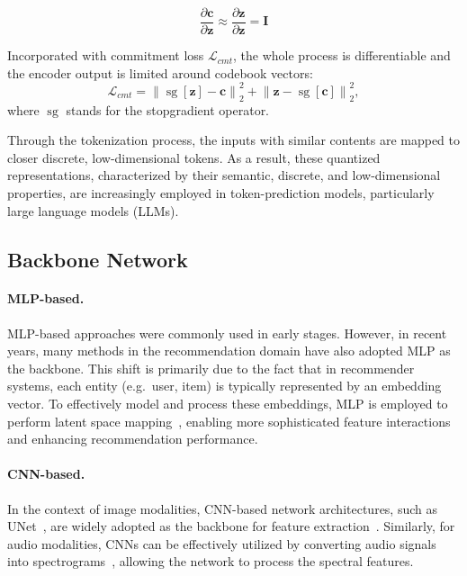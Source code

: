 \begin{equation}
\frac{\partial \boldsymbol{c}}{\partial \boldsymbol{z}} \approx \frac{\partial \boldsymbol{z}}{\partial \boldsymbol{z}}=\mathbf{I}
\end{equation}


Incorporated with commitment loss $\mathcal{L}_{cmt}$, the whole process is differentiable and the encoder output is limited around codebook vectors:
\begin{equation}
\mathcal{L}_{cmt}=\left\|\operatorname{sg}\left[\boldsymbol{z}\right]-\boldsymbol{c}\right\|_2^2+\left\|\boldsymbol{z}-\operatorname{sg}[\boldsymbol{c}]\right\|_2^2,
\end{equation}
where $\operatorname{sg}$ stands for the stopgradient operator.

Through the tokenization process, the inputs with similar contents are mapped to closer discrete, low-dimensional tokens. 
As a result, these quantized representations, characterized by their semantic, discrete, and low-dimensional properties, are increasingly employed in token-prediction models, particularly large language models (LLMs).

\subsection{Backbone Network}

\paragraph{MLP-based.}
MLP-based approaches were commonly used in early stages. However, in recent years, many methods in the recommendation domain have also adopted MLP as the backbone. 
This shift is primarily due to the fact that in recommender systems, each entity (e.g.\ user, item) is typically represented by an embedding vector. 
To effectively model and process these embeddings, MLP is employed to perform latent space mapping~\cite{rajput2023tiger,singh2024better}, enabling more sophisticated feature interactions and enhancing recommendation performance.

\paragraph{CNN-based.}
In the context of image modalities, CNN-based network architectures, such as UNet~\cite{ronneberger2015unet}, are widely adopted as the backbone for feature extraction~\cite{esser2021vqgan}. 
Similarly, for audio modalities, CNNs can be effectively utilized by converting audio signals into spectrograms~\cite{zeghidour2021soundstream}, allowing the network to process the spectral features. 

